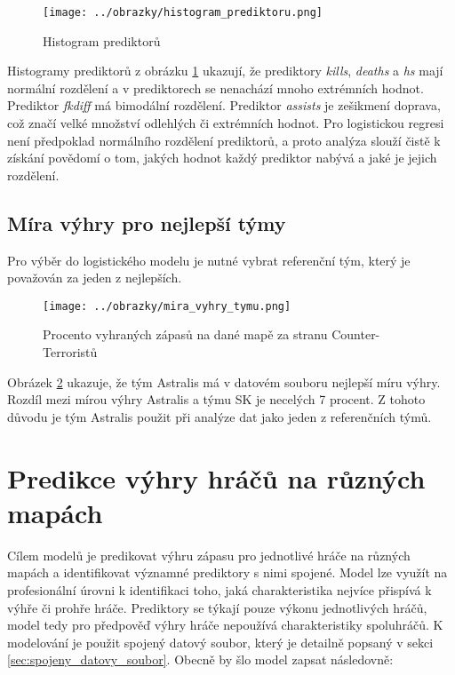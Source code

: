 \begin{figure}[H]
    \centering
    \texttt{[image: ../obrazky/histogram\_prediktoru.png]}
    \caption{Histogram prediktorů} 
    \label{fig:histogram_prediktoru}
\end{figure}

Histogramy prediktorů z obrázku \ref{fig:histogram_prediktoru} ukazují, že prediktory \textit{kills}, \textit{deaths} a \textit{hs} mají normální rozdělení
a v prediktorech se nenachází mnoho extrémních hodnot. Prediktor \textit{fkdiff} má bimodální rozdělení. Prediktor \textit{assists} je 
zešikmení doprava, což značí velké množství odlehlých či extrémních hodnot. Pro logistickou regresi není předpoklad normálního rozdělení prediktorů, a proto analýza
slouží čistě k získání povědomí o tom, jakých hodnot každý prediktor nabývá a jaké je jejich rozdělení.

\subsection{Míra výhry pro nejlepší týmy}
Pro výběr do logistického modelu je nutné vybrat referenční tým, který je považován za jeden z nejlepších. 

\begin{figure}[H]
    \centering
    \texttt{[image: ../obrazky/mira\_vyhry\_tymu.png]}
    \caption{Procento vyhraných zápasů na dané mapě za stranu Counter-Terroristů} 
    \label{fig:mira_vyhry_tymu}
\end{figure}

Obrázek \ref{fig:mira_vyhry_tymu} ukazuje, že tým Astralis má v datovém souboru nejlepší míru výhry. Rozdíl mezi mírou výhry Astralis a týmu SK je necelých 7 procent.
Z tohoto důvodu je tým Astralis použit při analýze dat jako jeden z referenčních týmů.

\newpage
\section{Predikce výhry hráčů na různých mapách}
Cílem modelů je predikovat výhru zápasu pro jednotlivé hráče na různých mapách a identifikovat významné prediktory s nimi spojené. Model lze využít na profesionální
úrovni k identifikaci toho, jaká charakteristika nejvíce přispívá k výhře či prohře hráče. Prediktory se týkají pouze výkonu jednotlivých
hráčů, model tedy pro předpověď výhry hráče nepoužívá charakteristiky spoluhráčů. K modelování je použit spojený datový soubor, který je detailně popsaný v
sekci \ref{sec:spojeny_datovy_soubor}. Obecně by šlo model zapsat následovně:

